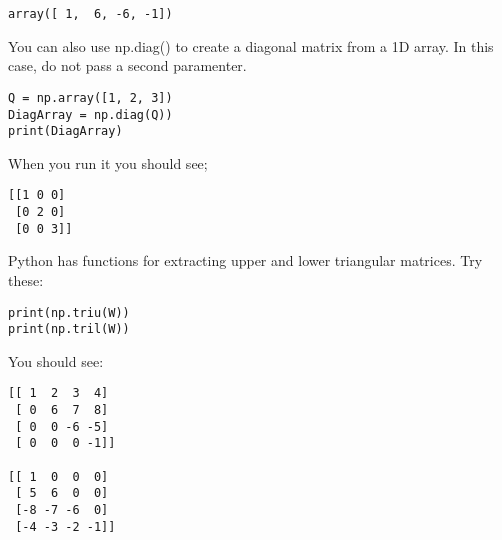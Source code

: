\begin{Verbatim}
array([ 1,  6, -6, -1])
\end{Verbatim}
You can also use np.diag() to create a diagonal matrix from a 1D array. In this case, do not pass a second paramenter.
\begin{Verbatim}
Q = np.array([1, 2, 3])
DiagArray = np.diag(Q))
print(DiagArray)
\end{Verbatim}
When you run it you should see;
\begin{Verbatim}
[[1 0 0]
 [0 2 0]
 [0 0 3]]
\end{Verbatim}
Python has functions for extracting upper and lower triangular matrices. Try these:
\begin{Verbatim}
print(np.triu(W))
print(np.tril(W))
\end{Verbatim}
You should see:
\begin{Verbatim}
[[ 1  2  3  4]
 [ 0  6  7  8]
 [ 0  0 -6 -5]
 [ 0  0  0 -1]]
 
[[ 1  0  0  0]
 [ 5  6  0  0]
 [-8 -7 -6  0]
 [-4 -3 -2 -1]]
\end{Verbatim}



